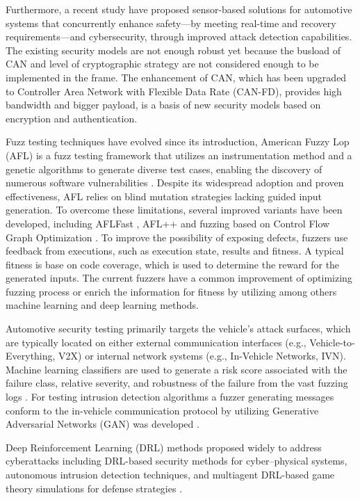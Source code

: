 \documentclass[a4paper, fleqn]{template/cas-dc}
\begin{document}
	Furthermore, a recent study \cite{wang2020real} have proposed sensor-based solutions for automotive systems that concurrently enhance safety—by meeting real-time and recovery requirements—and cybersecurity, through improved attack detection capabilities. The existing security models are not enough robust yet because the busload of CAN and level of cryptographic strategy are not considered enough to be implemented in the frame. The enhancement of CAN, which has been upgraded to Controller Area Network with Flexible Data Rate (CAN-FD), provides high bandwidth and bigger payload, is a basis of new security models based on encryption and authentication.\cite{AUTOSAR_SecOC_R24_11}
	
	Fuzz testing techniques have evolved since its introduction, American Fuzzy Lop (AFL) is a fuzz testing framework that utilizes an instrumentation method and a genetic algorithms to generate diverse test cases, enabling the discovery of numerous software vulnerabilities \cite{zalewski2017american}. Despite its widespread adoption and proven effectiveness, AFL relies on blind mutation strategies lacking guided input generation. To overcome these limitations, several improved variants have been developed, including AFLFast \cite{bohme2016coverage}, AFL++ \cite{fioraldi2020afl++} and fuzzing based on Control Flow Graph Optimization \cite{10662925}. To improve the possibility of exposing defects, fuzzers use feedback from executions, such as execution state, results and fitness. A typical fitness is base on code coverage, which is used to determine the reward for the generated inputs. The current fuzzers have a common improvement of optimizing fuzzing process or enrich the information for fitness by utilizing among others machine learning and deep learning methods.\cite{zhu2022fuzzing}
	
	Automotive security testing primarily targets the vehicle's attack surfaces, which are typically located on either external communication interfaces (e.g., Vehicle-to-Everything, V2X) or internal network systems (e.g., In-Vehicle Networks, IVN). Machine learning classifiers are used to generate a risk score associated with the failure class, relative severity, and robustness of the failure from the vast fuzzing logs \cite{kayas2023ai}. 
	For testing intrusion detection algorithms a fuzzer generating messages conform to the in-vehicle communication protocol by utilizing Generative Adversarial Networks (GAN) was developed \cite{li2022gan}.
	
	Deep Reinforcement Learning (DRL) methods proposed widely to address cyberattacks including DRL-based security methods for cyber–physical systems, autonomous intrusion detection techniques, and multiagent DRL-based game theory simulations for defense strategies \cite{nguyen2021deep} \cite{ferdowsi2018robust}.
	
\end{document}
